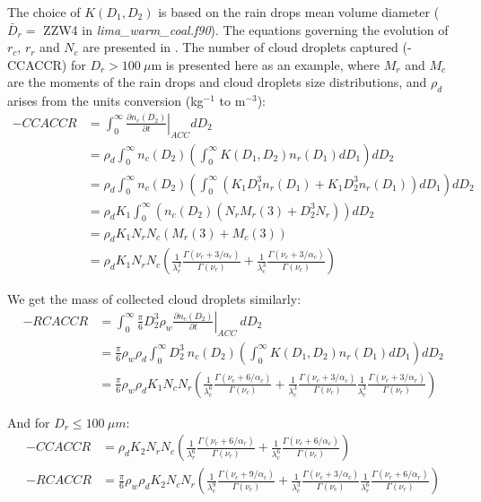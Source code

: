 The choice of $K(D_1,D_2)$ is based on the rain drops mean volume diameter ($\bar{D}_r=$ ZZW4 in \emph{lima\_warm\_coal.f90}). The equations governing the evolution of $r_c$, $r_r$ and $N_c$ are presented in \citet{Cohard2000c2r2}. The number of cloud droplets captured (-CCACCR) for $D_r > 100~\mu$m is presented here as an example, where $M_r$ and $M_c$ are the moments of the rain drops and cloud droplets size distributions, and $\rho_d$ arises from the units conversion (kg$^{-1}$ to m$^{-3}$):
\begin{align}
 -CCACCR &= \int_0^\infty \left. \frac{\partial n_c(D_2)}{\partial t}\right|_{ACC} dD_2 \\
 &= \rho_d \int_0^\infty n_c(D_2) \left( \int_0^\infty K(D_1,D_2)n_r(D_1)dD_1 \right) dD_2 \\
 &= \rho_d \int_0^\infty n_c(D_2) \left( \int_0^\infty \left( K_1 D_1^3 n_r(D_1) + K_1 D_2^3 n_r(D_1) \right) dD_1 \right) dD_2 \\
 &= \rho_d K_1 \int_0^\infty \left( n_c(D_2) \left( N_r M_r(3) + D_2^3 N_r \right) \right) dD_2 \\
 &= \rho_d K_1 N_r N_c \left( M_r(3) + M_c(3) \right) \\
 &= \rho_d K_1 N_r N_c \left( \frac{1}{\lambda_r^3} \frac{\Gamma(\nu_r+3/\alpha_r)}{\Gamma(\nu_r)} + \frac{1}{\lambda_c^3} \frac{\Gamma(\nu_c+3/\alpha_c)}{\Gamma(\nu_c)} \right)
\end{align}

We get the mass of collected cloud droplets similarly:
\begin{align}
 -RCACCR &= \int_0^\infty \frac{\pi}{6} D_2^3 \rho_w \left. \frac{\partial n_c(D_2)}{\partial t}\right|_{ACC} ~dD_2 \\
 &= \frac{\pi}{6} \rho_w \rho_d \int_0^\infty D_2^3 ~ n_c(D_2) \left( \int_0^\infty K(D_1,D_2)n_r(D_1)dD_1 \right) dD_2 \\
 &= \frac{\pi}{6} \rho_w \rho_d K_1 N_c N_r \left( \frac{1}{\lambda_c^6} \frac{\Gamma(\nu_c+6/\alpha_c)}{\Gamma(\nu_c)} + \frac{1}{\lambda_c^3} \frac{\Gamma(\nu_c+3/\alpha_c)}{\Gamma(\nu_c)} \frac{1}{\lambda_r^3} \frac{\Gamma(\nu_r+3/\alpha_r)}{\Gamma(\nu_r)} \right)
\end{align}

And for $D_r \leq 100~\mu m$:
\begin{align}
 -CCACCR &= \rho_d K_2 N_r N_c \left( \frac{1}{\lambda_r^6} \frac{\Gamma(\nu_r+6/\alpha_r)}{\Gamma(\nu_r)} + \frac{1}{\lambda_c^6} \frac{\Gamma(\nu_c+6/\alpha_c)}{\Gamma(\nu_c)} \right) \\
 -RCACCR &= \frac{\pi}{6} \rho_w \rho_d K_2 N_c N_r \left( \frac{1}{\lambda_c^9} \frac{\Gamma(\nu_c+9/\alpha_c)}{\Gamma(\nu_c)} + \frac{1}{\lambda_c^3} \frac{\Gamma(\nu_c+3/\alpha_c)}{\Gamma(\nu_c)} \frac{1}{\lambda_r^6} \frac{\Gamma(\nu_r+6/\alpha_r)}{\Gamma(\nu_r)} \right)
\end{align}

